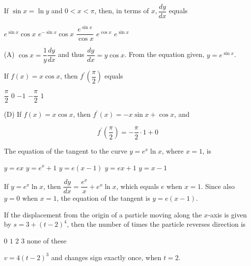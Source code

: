 \newpage




\question
If $\sin x=\ln y$ and $0<x<\pi$, then, in terms of $x, \dfrac{d y}{d x}$ equals
\begin{choices}
  \CorrectChoice $e^{\sin x} \cos x$
  \choice $e^{-\sin x} \cos x$
  \choice $\dfrac{e^{\sin x}}{\cos x}$
  \choice $e^{\cos x}$
  \choice $e^{\sin x}$
\end{choices}
\begin{solution}
(A) $\cos x=\dfrac{1}{y} \dfrac{d y}{d x}$ and thus $\dfrac{d y}{d x}=y \cos x$. From the equation given, $y=e^{\sin x}$.
\end{solution}

\question
If $f(x)=x \cos x$, then $f^{\prime}\left(\dfrac{\pi}{2}\right)$ equals
\begin{choices}
  \choice $\dfrac{\pi}{2}$
  \choice $0$
  \choice $-1$
  \CorrectChoice $-\dfrac{\pi}{2}$
  \choice $1$
\end{choices}
\begin{solution}
(D) If $f(x)=x \cos x$, then $f^{\prime}(x)=-x \sin x+\cos x$, and

\[
f^{\prime}\left(\dfrac{\pi}{2}\right)=-\dfrac{\pi}{2} \cdot 1+0
\]


\end{solution}

\question
The equation of the tangent to the curve $y=e^{x} \ln x$, where $x=1$, is
\begin{choices}
  \choice $y=e x$
  \choice $y=e^{x}+1$
  \CorrectChoice $y=e(x-1)$
  \choice $y=e x+1$
  \choice $y=x-1$
\end{choices}
\begin{solution}
If $y=e^{x} \ln x$, then $\dfrac{d y}{d x}=\dfrac{e^{x}}{x}+e^{x} \ln x$, which equals $e$ when $x=1$. Since also $y=0$ when $x=1$, the equation of the tangent is $y=e(x-1)$.
\end{solution}




\newpage




\question
If the displacement from the origin of a particle moving along the $x$-axis is given by $s=3+(t-2)^{4}$, then the number of times the particle reverses direction is
\begin{choices}
  \choice $0$
  \CorrectChoice $1$
  \choice $2$
  \choice $3$
  \choice none of these
\end{choices}
\begin{solution}
$v=4(t-2)^{3}$ and changes sign exactly once, when $t=2$.
\end{solution}

